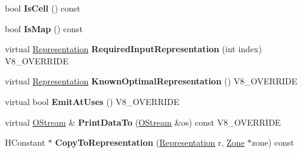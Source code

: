 \begin{DoxyCompactItemize}
\item 
\hypertarget{classv8_1_1internal_1_1_v8___f_i_n_a_l_abe33ed3eb5c558c6b61a3d6248cd8e56}{}bool {\bfseries Is\+Cell} () const \label{classv8_1_1internal_1_1_v8___f_i_n_a_l_abe33ed3eb5c558c6b61a3d6248cd8e56}

\item 
\hypertarget{classv8_1_1internal_1_1_v8___f_i_n_a_l_a7cba7d2b3e89bbdc03f568655d659da6}{}bool {\bfseries Is\+Map} () const \label{classv8_1_1internal_1_1_v8___f_i_n_a_l_a7cba7d2b3e89bbdc03f568655d659da6}

\item 
\hypertarget{classv8_1_1internal_1_1_v8___f_i_n_a_l_a6c6d1f37f40b113d8f4062f1ffff7215}{}virtual \hyperlink{classv8_1_1internal_1_1_representation}{Representation} {\bfseries Required\+Input\+Representation} (int index) V8\+\_\+\+O\+V\+E\+R\+R\+I\+D\+E\label{classv8_1_1internal_1_1_v8___f_i_n_a_l_a6c6d1f37f40b113d8f4062f1ffff7215}

\item 
\hypertarget{classv8_1_1internal_1_1_v8___f_i_n_a_l_a03cf853403dec841cfc7e6277aaf3279}{}virtual \hyperlink{classv8_1_1internal_1_1_representation}{Representation} {\bfseries Known\+Optimal\+Representation} () V8\+\_\+\+O\+V\+E\+R\+R\+I\+D\+E\label{classv8_1_1internal_1_1_v8___f_i_n_a_l_a03cf853403dec841cfc7e6277aaf3279}

\item 
\hypertarget{classv8_1_1internal_1_1_v8___f_i_n_a_l_ad3cda26c728127e9722319d83ab6c450}{}virtual bool {\bfseries Emit\+At\+Uses} () V8\+\_\+\+O\+V\+E\+R\+R\+I\+D\+E\label{classv8_1_1internal_1_1_v8___f_i_n_a_l_ad3cda26c728127e9722319d83ab6c450}

\item 
\hypertarget{classv8_1_1internal_1_1_v8___f_i_n_a_l_ac450dad970b14246be761ccf5004924b}{}virtual \hyperlink{classv8_1_1internal_1_1_o_stream}{O\+Stream} \& {\bfseries Print\+Data\+To} (\hyperlink{classv8_1_1internal_1_1_o_stream}{O\+Stream} \&os) const V8\+\_\+\+O\+V\+E\+R\+R\+I\+D\+E\label{classv8_1_1internal_1_1_v8___f_i_n_a_l_ac450dad970b14246be761ccf5004924b}

\item 
\hypertarget{classv8_1_1internal_1_1_v8___f_i_n_a_l_a7d9ad187f0d9d0ee7a1df55fbeaecfac}{}H\+Constant $\ast$ {\bfseries Copy\+To\+Representation} (\hyperlink{classv8_1_1internal_1_1_representation}{Representation} r, \hyperlink{classv8_1_1internal_1_1_zone}{Zone} $\ast$zone) const \label{classv8_1_1internal_1_1_v8___f_i_n_a_l_a7d9ad187f0d9d0ee7a1df55fbeaecfac}


\end{DoxyCompactItemize}
